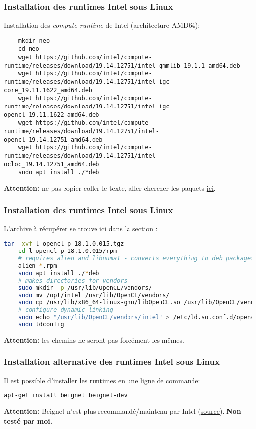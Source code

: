 \documentclass[9pt]{beamer}
\begin{document}
\begin{frame}[fragile]
    \frametitle{Installation des runtimes Intel sous Linux}
    Installation des \textit{compute runtime} de Intel (architecture AMD64):
    \begin{lstlisting}
    mkdir neo
    cd neo
    wget https://github.com/intel/compute-runtime/releases/download/19.14.12751/intel-gmmlib_19.1.1_amd64.deb
    wget https://github.com/intel/compute-runtime/releases/download/19.14.12751/intel-igc-core_19.11.1622_amd64.deb
    wget https://github.com/intel/compute-runtime/releases/download/19.14.12751/intel-igc-opencl_19.11.1622_amd64.deb
    wget https://github.com/intel/compute-runtime/releases/download/19.14.12751/intel-opencl_19.14.12751_amd64.deb
    wget https://github.com/intel/compute-runtime/releases/download/19.14.12751/intel-ocloc_19.14.12751_amd64.deb
    sudo apt install ./*deb
    \end{lstlisting}
    \vspace{20pt}
    \textbf{Attention:} ne pas copier coller le texte, aller chercher les 
    paquets \href{https://github.com/intel/compute-runtime/releases}{ici}.
\end{frame}

\begin{frame}[fragile]
    \frametitle{Installation des runtimes Intel sous Linux}
    L'archive à récupérer se trouve 
    \href{https://software.intel.com/content/www/us/en/develop/articles/opencl-drivers.html}{ici} 
    dans la section :
    \begin{lstlisting}[language=sh]
    tar -xvf l_opencl_p_18.1.0.015.tgz
    cd l_opencl_p_18.1.0.015/rpm
    # requires alien and libnuma1 - converts everything to deb packages
    alien *.rpm
    sudo apt install ./*deb
    # makes directories for vendors
    sudo mkdir -p /usr/lib/OpenCL/vendors/
    sudo mv /opt/intel /usr/lib/OpenCL/vendors/
    sudo cp /usr/lib/x86_64-linux-gnu/libOpenCL.so /usr/lib/OpenCL/vendors/intel/libOpenCL.so
    # configure dynamic linking
    sudo echo "/usr/lib/OpenCL/vendors/intel" > /etc/ld.so.conf.d/opencl-vendor-intel.conf
    sudo ldconfig
    \end{lstlisting}
    \vspace{20pt}
    \textbf{Attention:} les chemins ne seront pas forcément les mêmes.
\end{frame}

\begin{frame}[fragile]
    \frametitle{Installation alternative des runtimes Intel sous Linux}
    Il est possible d'installer les runtimes en une ligne de commande:
    \begin{lstlisting}[language=sh]
    apt-get install beignet beignet-dev
    \end{lstlisting}
    \vspace{20pt}
    \textbf{Attention:} Beignet n'est plus recommandé/maintenu par Intel 
    (\href{https://software.intel.com/en-us/forums/opencl/topic/758168}{source}).
    \newline
    \textbf{Non testé par moi.}
\end{frame}
\end{document}
